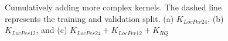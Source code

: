 \begin{figure}[H]
    \centering
    \graphicspath{ {./images/} }
     \\
     \\
    \caption{Cumulatively adding more complex kernels. The dashed line represents the training and validation split. (a) $K_{LocPer24}$, (b) $K_{LocPer12}$, and (c) $K_{LocPer24} + K_{LocPer12} + K_{RQ}$}  \label{fig:AB}
    \label{fig:figure.13}
\end{figure}

